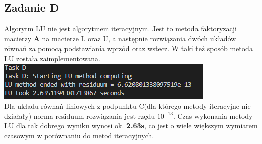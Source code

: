 \documentclass[12pt]{article}
\begin{document}
\subsection{Zadanie D}
Algorytm LU nie jest algorytmem iteracyjnym. Jest to metoda faktoryzacji macierzy \textbf{A} na macierze L oraz U, a następnie rozwiązania dwóch układów równań 
za pomocą podstawiania wprzód oraz wstecz. W taki też sposób metoda LU została zaimplementowana.\\
\includegraphics{zadanieD_1}\\
Dla układu równań liniowych z podpunktu C(dla którego metody iteracyjne nie działały) norma residuum rozwiązania  jest rzędu $10^{-13}$.
Czas wykonania metody LU dla tak dobrego wyniku wynosi ok. \textbf{2.63s}, co jest o wiele większym wymiarem czasowym w porównaniu do metod iteracyjnych.
\end{document}
